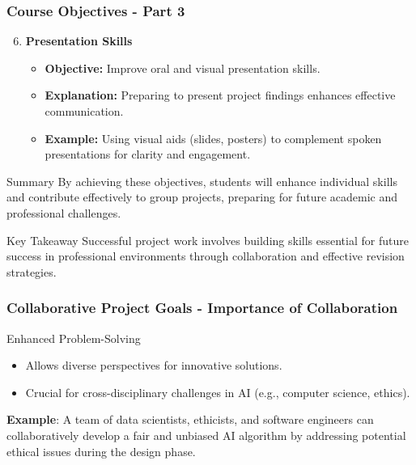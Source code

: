 \documentclass[aspectratio=169]{beamer}
\begin{document}
\begin{frame}[fragile]
    \frametitle{Course Objectives - Part 3}
    \begin{enumerate}
        \setcounter{enumi}{5} %
        \item \textbf{Presentation Skills}
        \begin{itemize}
            \item \textbf{Objective:} Improve oral and visual presentation skills.
            \item \textbf{Explanation:} Preparing to present project findings enhances effective communication.
            \item \textbf{Example:} Using visual aids (slides, posters) to complement spoken presentations for clarity and engagement.
        \end{itemize}
    \end{enumerate}

    \begin{block}{Summary}
        By achieving these objectives, students will enhance individual skills and contribute effectively to group projects, preparing for future academic and professional challenges.
    \end{block}
    
    \begin{block}{Key Takeaway}
        Successful project work involves building skills essential for future success in professional environments through collaboration and effective revision strategies.
    \end{block}
\end{frame}

\begin{frame}[fragile]
    \frametitle{Collaborative Project Goals - Importance of Collaboration}
    \begin{block}{Enhanced Problem-Solving}
        \begin{itemize}
            \item Allows diverse perspectives for innovative solutions.
            \item Crucial for cross-disciplinary challenges in AI (e.g., computer science, ethics).
        \end{itemize}
        \textbf{Example}: A team of data scientists, ethicists, and software engineers can collaboratively develop a fair and unbiased AI algorithm by addressing potential ethical issues during the design phase.
    \end{block}
\end{frame}
\end{document}
